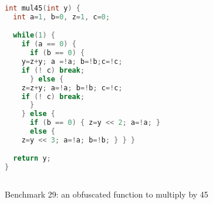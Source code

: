 \begin{figure}
 \begin{lstlisting}[language=C++]
int mul45(int y) {
  int a=1, b=0, z=1, c=0;

  while(1) {
    if (a == 0) {
      if (b == 0) {
	y=z+y; a =!a; b=!b;c=!c;
	if (! c) break;
      } else {
	z=z+y; a=!a; b=!b; c=!c;
	if (! c) break;
      }
    } else {
      if (b == 0) { z=y << 2; a=!a; }
      else {
	z=y << 3; a=!a; b=!b; } } }

  return y;
}
	
 \end{lstlisting}

 \caption{Benchmark 29: an obfuscated function to multiply by 45}
 
\end{figure}

\fi
